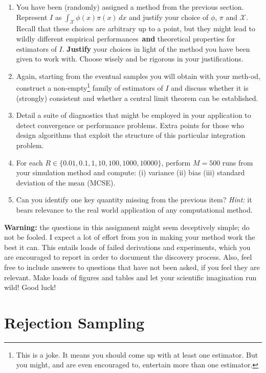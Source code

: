 \documentclass[a4paper,10pt, notitlepage]{report}
\begin{document}
\begin{enumerate}
 \item You have been (randomly) assigned a method from the previous section.
 Represent $I$ as $\int_{\mathcal{X}} \phi(x)\pi(x)\,dx$ and justify your choice of $\phi$, $\pi$ and $\mathcal{X}$.
 Recall that these choices are arbitrary up to a point, but they might lead to wildly different empirical performances~\textbf{and} theoretical properties for estimators of $I$.
 \textbf{Justify} your choices in light of the method you have been given to work with.
 Choose wisely and be rigorous in your justifications.
 \item Again, starting from the eventual samples you will obtain with your meth-od, construct a non-empty\footnote{This is a joke. It means you should come up with at least one estimator. But you might, and are even encouraged to, entertain more than one estimator.} family of estimators of $I$ and discuss whether it is (strongly) consistent and whether a central limit theorem can be established.
 \item Detail a suite of diagnostics that might be employed in your application to detect convergence or performance problems.
 Extra points for those who design algorithms that exploit the structure of this particular integration problem. 
 \item For each $R \in \{0.01, 0.1, 1, 10, 100, 1000, 10000\}$, perform $M=500$ runs from your simulation method and compute: (i) variance (ii) bias (iii) standard deviation of the mean (MCSE).
 \item Can you identify one key quantity missing from the previous item?
 \textit{Hint:} it bears relevance to the real world application of any computational method.
\end{enumerate}

\textbf{Warning:} the questions in this assignment might seem deceptively simple; do not be fooled. I expect a lot of effort from you in making your method work the best it can. This entails loads of failed derivations and experiments, which you are encouraged to report in order to document the discovery process.
Also, feel free to include answers to questions that have not been asked, if you feel they are relevant. 
Make loads of figures and tables and let your scientific imagination run wild! 
Good luck! 

\newpage

\section*{Rejection Sampling}
\end{document}
